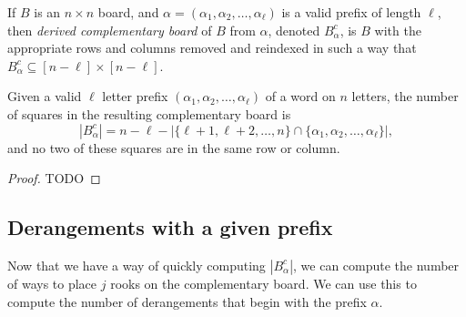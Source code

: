 \begin{definition}
  If $B$ is an $n \times n$ board, and
  $\alpha = (\alpha_1, \alpha_2, \dots, \alpha_\ell)$ is a valid prefix of length
  $\ell$, then \textit{derived complementary board} of $B$ from $\alpha$, denoted $B^c_\alpha$,
  is $B$ with the appropriate rows and columns removed and reindexed in such
  a way that $B^c_\alpha \subseteq [n - \ell] \times [n - \ell]$.
\end{definition}
\begin{lemma}
  Given a valid $\ell$ letter prefix $(\alpha_1, \alpha_2, \dots, \alpha_\ell)$
  of a word on $n$ letters,
  the number of squares in the resulting complementary board is \[
    |B_\alpha^c| = n - \ell - |\{\ell+1, \ell+2, \dots, n\} \cap \{\alpha_1, \alpha_2, \dots, \alpha_\ell\}|,
  \] and no two of these squares are in the same row or column.
\end{lemma}
\begin{proof}
  TODO
\end{proof}

\subsection{Derangements with a given prefix}
Now that we have a way of quickly computing $|B_\alpha^c|$, we can compute the
number of ways to place $j$ rooks on the complementary board. We can use this
to compute the number of derangements that begin with the prefix $\alpha$.

